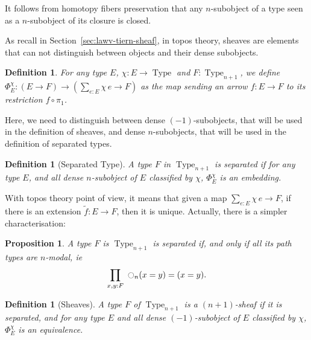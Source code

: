\documentclass[preprint,9pt,numbers]{sigplanconf}
\newtheorem{prop}[thm]{Proposition}
\newtheorem{defi}[thm]{Definition}
\DeclareMathOperator{\Type}{Type}
\newcommand{\modal}{\ensuremath{\ocircle}}
\newenvironment{mymath}[1][-0em]{%
  \newcommand\mymathaux{\vspace{#1}}%
  \vspace{#1}%
  \begin{equation*}%
  }{ %
    \mymathaux%
  \end{equation*}}
\begin{document}
It follows from homotopy fibers preservation that any $n$-subobject of
a type seen as a $n$-subobject of its closure is closed.

As recall in Section~\ref{sec:lawv-tiern-sheaf}, in topos theory,
sheaves are elements that can not distinguish between objects and
their dense subobjects. 

\begin{defi}
  For any type $E$, $\chi : E \to \Type$ and $F:\Type_{n+1}$, we define
    $\Phi_E^\chi : (E \to F) \to (\sum_{e:E} \chi\, e \to F) $
    as the map sending an  arrow $f:E\to F$ to its restriction $f \circ \pi_1$.
\end{defi}

Here, we need to distinguish between
dense $(-1)$-sub\-objects, that will be used in the definition of
sheaves, and dense $n$-subobjects, that will be used in the definition
of separated types. 

\begin{defi}[Separated Type]
  A type $F$ in $\Type_{n+1}$ is {\em separated} if for any type $E$, and
  all dense $n$-subobject of $E$ classified by $\chi$,
  $\Phi_E^\chi$ is an embedding.%

\end{defi}

With topos theory point of view, it means that given a map $\sum_{e:E}
\chi\, e \to F$,
if there is an extension $\tilde f:E\to F$, then it is unique.
Actually, there is a simpler characterisation:

\begin{prop}
  A type $F$ is $\Type_{n+1}$ is separated if, and only if all its
  path types are $n$-modal, ie
  \begin{mymath}[-0.3em]\prod_{x,y:F}~\modal_n(x=y) = (x=y).\end{mymath}%
\end{prop}

\begin{defi}[Sheaves]
  A type $F$ of $\Type_{n+1}$ is a {\em $(n+1)$-sheaf} if it is
  separated, and for any type $E$ and all dense $(-1)$-subobject of
  $E$ classified by $\chi$, $\Phi_E^\chi$ is an
  equivalence. %

\end{defi}
\end{document}
